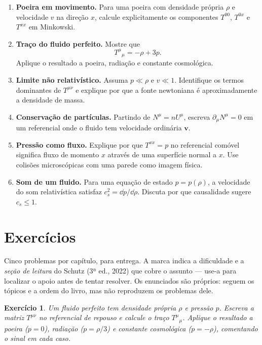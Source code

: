 \documentclass[12pt,a4paper,oneside]{book}
\theoremstyle{rgplain}
\newtheorem{exercise}{Exercício}[chapter]
\theoremstyle{rgremark}
\begin{document}
\begin{enumerate}
  \item \textbf{Poeira em movimento.} Para uma poeira com densidade própria
  $\rho$ e velocidade $v$ na direção $x$, calcule explicitamente os componentes
  $T^{00}$, $T^{0x}$ e $T^{xx}$ em Minkowski.

  \item \textbf{Traço do fluido perfeito.} Mostre que
  \[
    T^\mu{}_\mu=-\rho+3p.
  \]
  Aplique o resultado a poeira, radiação e constante cosmológica.

  \item \textbf{Limite não relativístico.} Assuma $p\ll\rho$ e $v\ll1$.
  Identifique os termos dominantes de $T^{\mu\nu}$ e explique por que a fonte
  newtoniana é aproximadamente a densidade de massa.

  \item \textbf{Conservação de partículas.} Partindo de $N^\mu=nU^\mu$,
  escreva $\partial_\mu N^\mu=0$ em um referencial onde o fluido tem velocidade
  ordinária $\bm v$.

  \item \textbf{Pressão como fluxo.} Explique por que $T^{xx}=p$ no referencial
  comóvel significa fluxo de momento $x$ através de uma superfície normal a
  $x$. Use colisões microscópicas com uma parede como imagem física.

  \item \textbf{Som de um fluido.} Para uma equação de estado $p=p(\rho)$, a
  velocidade do som relativística satisfaz $c_s^2=\dd p/\dd\rho$. Discuta por
  que causalidade sugere $c_s\le1$.
\end{enumerate}

\clearpage
\section{Exercícios}
\begin{leitura}
Cinco problemas por capítulo, para entrega. A marca indica a dificuldade e a \emph{seção de leitura} do Schutz (3ª ed., 2022) que cobre o assunto --- use-a para localizar o apoio antes de tentar resolver. Os enunciados são próprios: seguem os tópicos e a ordem do livro, mas não reproduzem os problemas dele.
\end{leitura}

\begin{exercise}
Um fluido perfeito tem densidade própria $\rho$ e pressão $p$. Escreva a
matriz $T^{\mu\nu}$ no referencial de repouso e calcule o traço
$T^\mu{}_\mu$. Aplique o resultado a poeira ($p=0$), radiação ($p=\rho/3$) e
constante cosmológica ($p=-\rho$), comentando o sinal em cada caso.
\end{exercise}
\end{document}
